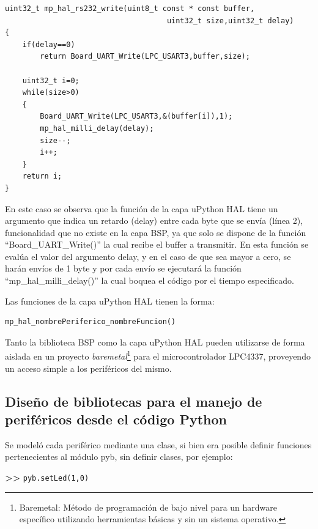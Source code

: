 \begin{lstlisting}[label={lst:uarthal},caption=Función de envío por la UART de la capa uPython HAL] 
uint32_t mp_hal_rs232_write(uint8_t const * const buffer, 
                                     uint32_t size,uint32_t delay)
{
    if(delay==0)
        return Board_UART_Write(LPC_USART3,buffer,size);

    uint32_t i=0;
    while(size>0)
    {
        Board_UART_Write(LPC_USART3,&(buffer[i]),1);
        mp_hal_milli_delay(delay);
        size--;
        i++;
    }
    return i;
}
\end{lstlisting}

En este caso se observa que la función de la capa uPython HAL tiene un argumento que indica un retardo (delay) entre cada byte que se envía (línea 2), funcionalidad que no existe en la capa BSP, ya que solo se dispone de la función “Board\_UART\_Write()” la cual recibe el buffer a transmitir.
En esta función se evalúa el valor del argumento delay, y en el caso de que sea mayor a cero, se harán envíos de 1 byte y por cada envío se ejecutará la función “mp\_hal\_milli\_delay()” la cual boquea el código por el tiempo especificado.

Las funciones de la capa uPython HAL tienen la forma:

\begin{verbatim}
mp_hal_nombrePeriferico_nombreFuncion()
\end{verbatim}

Tanto la biblioteca BSP como la capa uPython HAL pueden utilizarse de forma aislada en un proyecto \textit{baremetal}\footnote{Baremetal: Método de programación de bajo nivel para un hardware específico utilizando herramientas básicas y sin un sistema operativo.} para el microcontrolador LPC4337, proveyendo un acceso simple a los periféricos del mismo.


\subsection{Diseño de bibliotecas para el manejo de periféricos desde el código Python}

Se modeló cada periférico mediante una clase, si bien era posible definir funciones pertenecientes al módulo pyb, sin definir clases, por ejemplo:

\textbf{{\fontsize{16}{16}\selectfont \textgreater\textgreater}} \texttt{pyb.setLed(1,0)}

